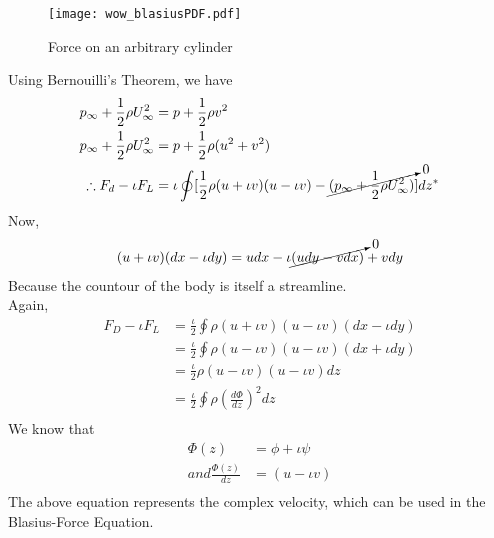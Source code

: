 \documentclass{book}
\begin{document}
\begin{figure}[!h]
\texttt{[image: wow\_blasiusPDF.pdf]}
\caption{Force on an arbitrary cylinder}
\end{figure}
\newpage
Using Bernouilli's Theorem, we have \textemdash
\begin{equation*}
\begin{split}
p_\infty + \frac{1}{2}\rho U_\infty ^2 &=p +\frac{1}{2}\rho v^2 \\
p_\infty + \frac{1}{2}\rho U_\infty ^2&=p + \frac{1}{2}\rho(u^2+v^2)\\
\therefore F_d-\iota F_L &= \iota \oint [\frac{1}{2}\rho (u+\iota v)(u-\iota v)-\cancelto{0}{(p_\infty + \frac{1}{2}\rho U_\infty ^2)}]dz^\ast \\
\end{split}
\end{equation*}
Now, 
\begin{equation*}
\begin{split}
(u+\iota v)(dx-\iota dy)&= udx -\iota \cancelto{0}{(udy -vdx)} +vdy\\
\end{split}
\end{equation*}
Because the countour of the body is itself a streamline.\\
Again,
\begin{equation*}
\begin{split}
F_D-\iota F_L &= \frac{\iota}{2}\oint \rho (u+\iota v)(u -\iota v)(dx-\iota dy)\\
&=\frac{\iota}{2}\oint \rho (u -\iota v)(u-\iota v)(dx +\iota dy)\\
&=\frac{\iota}{2}\rho (u-\iota v)(u-\iota v)dz\\
&=\frac{\iota}{2}\oint \rho (\frac{d\Phi}{dz})^2 dz \\
\end{split}
\end{equation*}
We know that \textemdash
\begin{equation*}
\begin{split}
\Phi(z)&=\phi+\iota \psi \\
and \frac{\Phi(z)}{dz}&=(u-\iota v)\\
\end{split}
\end{equation*}
The above equation represents the complex velocity, which can be used in the Blasius-Force Equation.
\end{document}
